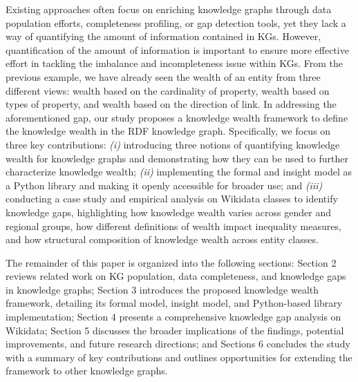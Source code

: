 Existing approaches often focus on enriching knowledge graphs through data population efforts, completeness profiling, or gap detection tools, yet they lack a way of quantifying the amount of information contained in KGs. However, quantification of the amount of information is important to ensure more effective effort in tackling the imbalance and incompleteness issue within KGs. From the previous example, we have already seen the wealth of an entity from three different views: wealth based on the cardinality of property, wealth based on types of property, and wealth based on the direction of link. In addressing the aforementioned gap, our study proposes a knowledge wealth framework to define the knowledge wealth in the RDF knowledge graph. Specifically, we focus on three key contributions: \textit{(i)} introducing three notions of quantifying knowledge wealth for knowledge graphs and demonstrating how they can be used to further characterize knowledge wealth; \textit{(ii)} implementing the formal and insight model as a Python library and making it openly accessible for broader use; and \textit{(iii)} conducting a case study and empirical analysis on Wikidata classes to identify knowledge gaps, highlighting how knowledge wealth varies across gender and regional groups, how different definitions of wealth impact inequality measures, and how structural composition of knowledge wealth across entity classes.

The remainder of this paper is organized into the following sections: Section 2 reviews related work on KG population, data completeness, and knowledge gaps in knowledge graphs; Section 3 introduces the proposed knowledge wealth framework, detailing its formal model, insight model, and Python-based library implementation; Section 4 presents a comprehensive knowledge gap analysis on Wikidata; Section 5 discusses the broader implications of the findings, potential improvements, and future research directions; and Sections 6 concludes the study with a summary of key contributions and outlines opportunities for extending the framework to other knowledge graphs.